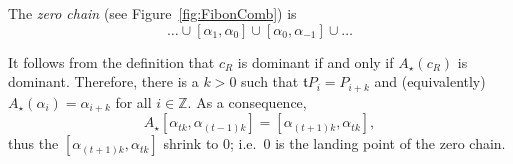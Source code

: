 \documentclass{amsart}
\newcommand{\1}{{\mathbb 1 }}
\newcommand{\str}{{\star}}
\renewcommand{\tt}{\mathfrak{t}}
\newcommand{\Z}{\mathbb{Z}}
\theoremstyle{remark}
\numberwithin{equation}{section}
\theoremstyle{definition}
\theoremstyle{nonumberbreak}
\begin{document}
The \emph{zero chain} (see Figure~\ref{fig:FibonComb}) is 
\begin{equation}
\label{eq:ZeroChain:defn}
\dots \cup[\alpha_1,\alpha_0]\cup [\alpha_0,\alpha_{-1}]\cup \dots
\end{equation}

It follows from the definition that $c_R$ is dominant if and only if $A_{\str} (c_R)$ is dominant. Therefore, there is a $k>0$ such that $\tt P_i=P_{i+k}$ and (equivalently) $A_{\str} (\alpha_{i})= \alpha_{i+k}$ for all $i\in \Z$. As a consequence,
\begin{equation}
\label{eq:zero chain:A str}
 A_{\str}[\alpha_{tk},\alpha_{(t-1)k}]=[\alpha_{(t+1)k},\alpha_{tk}],
 \end{equation} thus the $[\alpha_{(t+1)k},\alpha_{tk}]$ shrink to $0$; i.e.~$0$ is the landing point of the zero chain.
\end{document}
